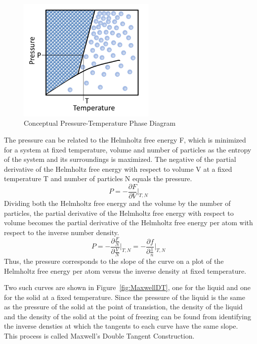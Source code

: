 \documentclass[double,12pt]{beavtex}
\begin{document}
\begin{figure}[h!]
    \centering
    \includegraphics[height=6cm]{P-T_Diagram.png}
    \caption{Conceptual Pressure-Temperature Phase Diagram}
    \label{fig:P-T_Diagram}
  \end{figure}
The pressure can be related to the Helmholtz free energy F, which is minimized 
for a system at fixed temperature, volume and number of particles as the 
entropy of the system and its surroundings is maximized. The negative of 
the partial derivative of the Helmholtz free energy with respect to volume V 
at a fixed temperature T and number of particles N equals the pressure. 
\begin{equation}{P=-\frac{\partial{F}}{\partial{V}}\bigg|_{T,N}}\end{equation}
\noindent Dividing both the Helmholtz free energy and the volume by the 
number of particles, the partial derivative of the Helmholtz free energy 
with respect to volume becomes the partial derivative of the Helmholtz 
free energy per atom with respect to the inverse number density. 
\begin{equation}{P=-\frac{\partial{\frac{F}{N}}}{\partial{\frac{V}{N}}}\bigg|_{T,N} = -\frac{\partial{f}}{\partial{\frac{1}{n}}}\bigg|_{T,N}}\end{equation} Thus, the pressure corresponds to the slope of the curve on a plot of the Helmholtz free energy per atom versus the inverse density at fixed temperature. 

Two such curves are shown in Figure~\ref{fig:MaxwellDT}, one for the liquid 
and one for the solid at a fixed temperature. Since the pressure of the 
liquid is the same as the pressure of the solid at the point of transistion, 
the density of the liquid and the density of the solid at the point of 
freezing can be found from identifying the inverse densties at which the 
tangents to each curve have the same slope. This process is called 
Maxwell's Double Tangent Construction. 
\end{document}
